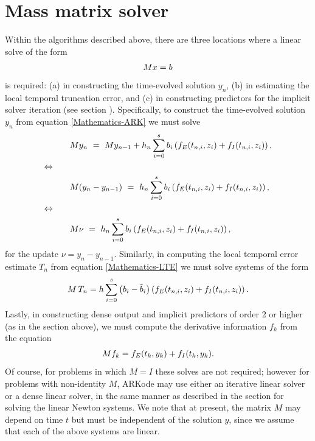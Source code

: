 \documentclass[letterpaper,10pt,english]{sphinxmanual}
\begin{document}
\section{Mass matrix solver}
\label{Mathematics:mass-matrix-solver}\label{Mathematics:mathematics-masssolve}
Within the algorithms described above, there are three locations where a
linear solve of the form
\begin{gather}
\begin{split}M x = b\end{split}\notag
\end{gather}
is required: (a) in constructing the time-evolved solution
\(y_n\), (b) in estimating the local temporal truncation error,
and (c) in constructing predictors for the implicit solver iteration
(see section {\hyperref[Mathematics:mathematics-predictors-max]{\emph{}}}).  Specifically, to
construct the time-evolved solution \(y_n\) from equation
\eqref{Mathematics-ARK} we must solve
\begin{gather}
\begin{split}&M y_n \ = \ M y_{n-1} + h_n \sum_{i=0}^{s} b_i \left(f_E(t_{n,i}, z_i)
              + f_I(t_{n,i}, z_i)\right), \\
\Leftrightarrow \qquad & \\
&M (y_n -y_{n-1}) \ = \ h_n \sum_{i=0}^{s} b_i \left(f_E(t_{n,i}, z_i)
              + f_I(t_{n,i}, z_i)\right), \\
\Leftrightarrow \qquad & \\
&M \nu \ = \ h_n \sum_{i=0}^{s} b_i \left(f_E(t_{n,i}, z_i)
              + f_I(t_{n,i}, z_i)\right),\end{split}\notag
\end{gather}
for the update \(\nu = y_n - y_{n-1}\).  Similarly, in computing
the local temporal error estimate \(T_n\) from equation \eqref{Mathematics-LTE}
we must solve systems of the form
\begin{gather}
\begin{split}M\, T_n = h \sum_{i=0}^{s} \left(b_i - \tilde{b}_i\right)
\left(f_E(t_{n,i}, z_i) + f_I(t_{n,i}, z_i)\right).\end{split}\notag
\end{gather}
Lastly, in constructing dense output and implicit predictors of order
2 or higher (as in the section {\hyperref[Mathematics:mathematics-predictors-max]{\emph{}}} above),
we must compute the derivative information \(f_k\) from the equation
\begin{gather}
\begin{split}M f_k = f_E(t_k, y_k) + f_I(t_k, y_k).\end{split}\notag
\end{gather}
Of course, for problems in which \(M=I\) these solves are not
required; however for problems with non-identity \(M\), ARKode may
use either an iterative linear solver or a dense linear solver, in the
same manner as described in the section {\hyperref[Mathematics:mathematics-linear]{\emph{}}} for solving
the linear Newton systems.  We note that at present, the matrix
\(M\) may depend on time \(t\) but must be independent of the
solution \(y\), since we assume that each of the above systems are
linear.
\end{document}
